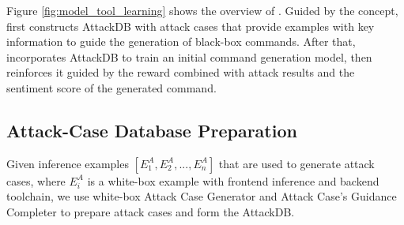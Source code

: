 {
Figure \ref{fig:model_tool_learning} shows the overview of {\tool}.
Guided by the concept, {\tool} first constructs AttackDB with attack cases that provide examples with key information to guide the generation of black-box commands.
After that, {\tool} incorporates AttackDB to train an initial command generation model, then reinforces it guided by the reward combined with attack results and the sentiment score of the generated command. 
}






\subsection{Attack-Case Database Preparation}
Given inference examples $[E^A_1,E^A_2,...,E^A_n]$ that are used to generate attack cases, where $E^A_i$ is a white-box example with frontend inference and backend toolchain, we use white-box {Attack Case Generator} and {Attack Case's Guidance Completer} to prepare attack cases and form the AttackDB.


